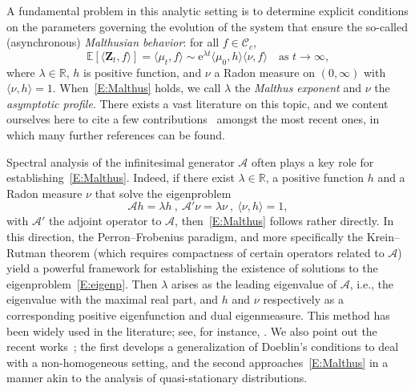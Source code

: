 \documentclass[11pt]{article}
\theoremstyle{definition}
\numberwithin{equation}{section}
\numberwithin{figure}{section}
\numberwithin{table}{section}
\newcommand\RR{\mathbb{R}}
\newcommand\Zz{\mathbf{Z}}
\newcommand\EE{\mathbb{E}}
\newcommand\e{\mathrm{e}}
\newcommand{\crochet}[1]{{\langle #1 \rangle}}
\begin{document}
A fundamental problem in this analytic setting is to determine explicit conditions on the parameters governing the evolution of the system that ensure the so-called (asynchronous) \emph{Malthusian behavior}: for all $f\in{\mathcal C}_c$,
\begin{equation}\label{E:Malthus}
\EE[\crochet{ \Zz_t,f}]=\crochet{\mu_t,f} \sim \e^{\lambda t}\crochet{\mu_0,h } \crochet{\nu,f}\quad \text{as }t \to \infty,
\end{equation}
where $\lambda \in \RR$, $h$ is positive function, and $\nu$ a Radon measure on $(0,\infty)$ with $\crochet{\nu,h }=1$. When~\eqref{E:Malthus} holds, we call $\lambda$ the \emph{Malthus exponent} and $\nu$ the \emph{asymptotic profile}. There exists a vast literature on this topic, and we content ourselves here to cite a few contributions~\cite{BerGab2, CalvoDoumicPerthame, DDGW, Esco} amongst the most recent ones, in which many further references can be found.

Spectral analysis of the infinitesimal generator ${\mathcal A}$ often plays a key role for establishing~\eqref{E:Malthus}. Indeed, if there exist $\lambda \in \RR$, a positive function $h$ and a Radon measure $\nu$ that solve the eigenproblem
\begin{equation}\label{E:eigenp}
{\mathcal A}h =\lambda h \ ,\ {\mathcal A}'\nu =\lambda \nu\ ,\
\crochet{\nu,h }=1,
\end{equation}
with $\mathcal{A}'$ the adjoint operator to $\mathcal{A}$, then~\eqref{E:Malthus} follows rather directly. In this direction, the Perron--Frobenius paradigm, and more specifically the Krein--Rutman theorem (which requires compactness of certain operators related to ${\mathcal A}$) yield a powerful framework for establishing the existence of solutions to the eigenproblem~\eqref{E:eigenp}. Then $\lambda$ arises as the leading eigenvalue of ${\mathcal A}$, i.e., the eigenvalue with the maximal real part, and $h$ and $\nu$ respectively as a corresponding positive eigenfunction and dual eigenmeasure. This method has been widely used in the literature; see, for instance, \cite{BCG-fine,DoumGab, MS16,Per07}. We also point out the recent works~\cite{BanCloGab, BCGM-qs}; the first develops a generalization of Doeblin's conditions to deal with a non-homogeneous setting, and the second approaches~\eqref{E:Malthus} in a manner akin to the analysis of quasi-stationary distributions.
\end{document}
